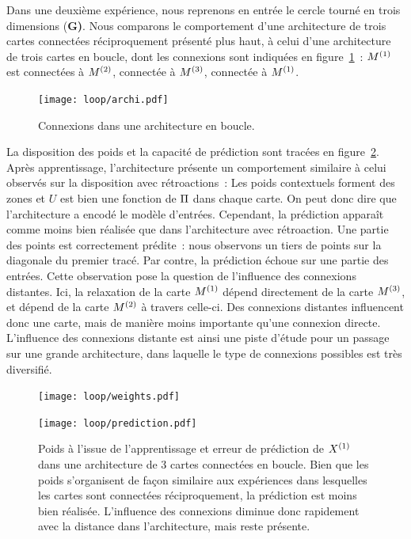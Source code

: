 \documentclass[../main]{subfiles}
\begin{document}
Dans une deuxième expérience, nous reprenons en entrée le cercle tourné en trois dimensions (\textbf{G)}. 
Nous comparons le comportement d'une architecture de trois cartes connectées réciproquement présenté plus haut, à celui d'une architecture de trois cartes en boucle, dont les connexions sont indiquées en figure~\ref{fig:archi_loop}~: $M^{({1})}$ est connectées à $M^{({2})}$, connectée à $M^{({3})}$, connectée à $M^{({1})}$.
\begin{figure}[h!]
	\centering\texttt{[image: loop/archi.pdf]}
	\caption{Connexions dans une architecture en \og boucle\fg{}. \label{fig:archi_loop}}
\end{figure}

La disposition des poids et la capacité de prédiction sont tracées en figure~\ref{fig:3som_loop}.
Après apprentissage, l'architecture présente un comportement similaire à celui observés sur la disposition avec rétroactions~: Les poids contextuels forment des zones et $U$ est bien une fonction de $\Pi$ dans chaque carte. On peut donc dire que l'architecture a encodé le modèle d'entrées.
Cependant, la prédiction apparaît comme moins bien réalisée que dans l'architecture avec rétroaction. Une partie des points est correctement prédite~: nous observons un tiers de points sur la diagonale du premier tracé.
Par contre, la prédiction échoue sur une partie des entrées.
Cette observation pose la question de l'influence des connexions distantes. Ici, la relaxation de la carte $M^{({1})}$ dépend directement de la carte $M^{({3})}$, et dépend de la carte $M^{({2})}$ à travers celle-ci.
Des connexions distantes influencent donc une carte, mais de manière moins importante qu'une connexion directe. 
L'influence des connexions distante est ainsi une piste d'étude pour un passage sur une grande architecture, dans laquelle le type de connexions possibles est très diversifié.


\begin{figure}[h!]
	\begin{minipage}{\textwidth}
		\centering\texttt{[image: loop/weights.pdf]}
	\end{minipage}
	\begin{minipage}{\textwidth}
		\centering\texttt{[image: loop/prediction.pdf]}
		\caption{Poids à l'issue de l'apprentissage et erreur de prédiction de $X^{({1})}$ dans une architecture de 3 cartes connectées en boucle. Bien que les poids s'organisent de façon similaire aux expériences dans lesquelles les cartes sont connectées réciproquement, la prédiction est moins bien réalisée. L'influence des connexions diminue donc rapidement avec la distance dans l'architecture, mais reste présente.\label{fig:3som_loop}}
	\end{minipage}
\end{figure}
\end{document}
